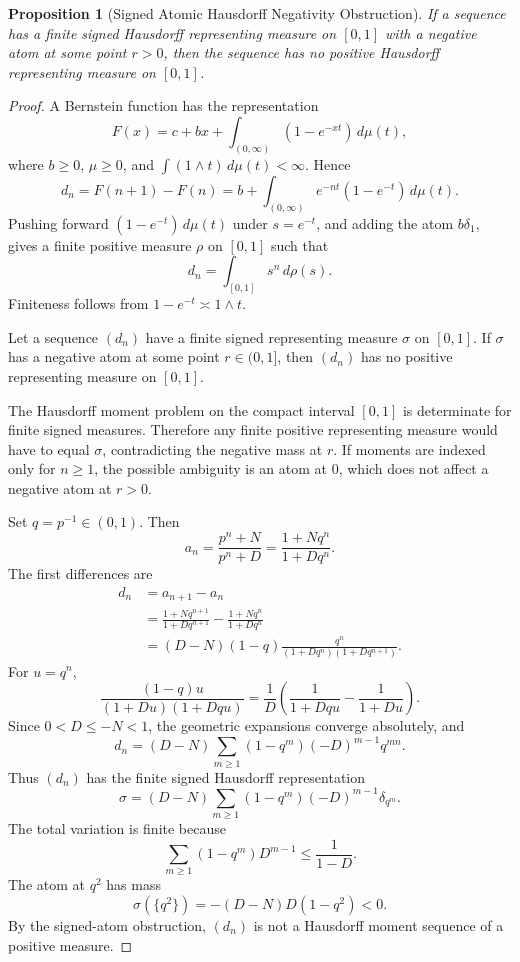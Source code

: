 \documentclass[11pt]{article}
\numberwithin{equation}{section}
\newtheorem{proposition}[theorem]{Proposition}
\theoremstyle{definition}
\theoremstyle{remark}
\newcommand{\1}{\mathbf 1}
\begin{document}
\begin{proposition}[Signed Atomic Hausdorff Negativity Obstruction]
\label{res:signed-atomic-hausdorff-negativity-obstruction}
If a sequence has a finite signed Hausdorff representing measure on \([0,1]\) with a negative atom at some point \(r>0\), then the sequence has no positive Hausdorff representing measure on \([0,1]\).
\end{proposition}

\begin{proof}
A Bernstein function has the representation
\[
F(x)=c+bx+\int_{(0,\infty)}(1-e^{-xt})\,d\mu(t),
\]
where \(b\ge0\), \(\mu\ge0\), and \(\int(1\wedge t)\,d\mu(t)<\infty\). Hence
\[
d_n=F(n+1)-F(n)
=b+\int_{(0,\infty)}e^{-nt}(1-e^{-t})\,d\mu(t).
\]
Pushing forward \((1-e^{-t})\,d\mu(t)\) under \(s=e^{-t}\), and adding the atom \(b\delta_1\), gives a finite positive measure \(\rho\) on \([0,1]\) such that
\[
d_n=\int_{[0,1]}s^n\,d\rho(s).
\]
Finiteness follows from \(1-e^{-t}\asymp 1\wedge t\).

Let a sequence \((d_n)\) have a finite signed representing measure \(\sigma\) on \([0,1]\). If \(\sigma\) has a negative atom at some point \(r\in(0,1]\), then \((d_n)\) has no positive representing measure on \([0,1]\).

The Hausdorff moment problem on the compact interval \([0,1]\) is determinate for finite signed measures. Therefore any finite positive representing measure would have to equal \(\sigma\), contradicting the negative mass at \(r\). If moments are indexed only for \(n\ge1\), the possible ambiguity is an atom at \(0\), which does not affect a negative atom at \(r>0\).

Set \(q=p^{-1}\in(0,1)\). Then
\[
a_n=\frac{p^n+N}{p^n+D}
=\frac{1+Nq^n}{1+Dq^n}.
\]
The first differences are
\[
\begin{aligned}
d_n
&=a_{n+1}-a_n\\
&=\frac{1+Nq^{n+1}}{1+Dq^{n+1}}
  -\frac{1+Nq^n}{1+Dq^n}\\
&=(D-N)(1-q)\frac{q^n}{(1+Dq^n)(1+Dq^{n+1})}.
\end{aligned}
\]
For \(u=q^n\),
\[
\frac{(1-q)u}{(1+Du)(1+Dqu)}
=\frac1D\left(\frac1{1+Dqu}-\frac1{1+Du}\right).
\]
Since \(0<D\le -N<1\), the geometric expansions converge absolutely, and
\[
d_n
=(D-N)\sum_{m\ge1}(1-q^m)(-D)^{m-1}q^{mn}.
\]
Thus \((d_n)\) has the finite signed Hausdorff representation
\[
\sigma
=(D-N)\sum_{m\ge1}(1-q^m)(-D)^{m-1}\delta_{q^m}.
\]
The total variation is finite because
\[
\sum_{m\ge1}(1-q^m)D^{m-1}\le \frac1{1-D}.
\]
The atom at \(q^2\) has mass
\[
\sigma(\{q^2\})=-(D-N)D(1-q^2)<0.
\]
By the signed-atom obstruction, \((d_n)\) is not a Hausdorff moment sequence of a positive measure.


\end{proof}
\end{document}
